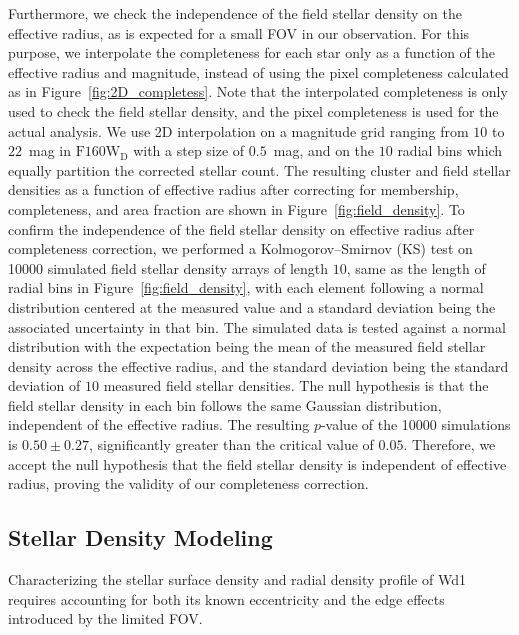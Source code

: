 \documentclass[12pt]{ucsddissertation}
\begin{document}
\begin{CJK*}{UTF8}{gbsn}
Furthermore, we check the independence of the field stellar density on the effective radius, as is expected for a small FOV in our observation. For this purpose, we interpolate the completeness for each star only as a function of the effective radius and magnitude, instead of using the pixel completeness calculated as in Figure~\ref{fig:2D_completess}. Note that the interpolated completeness is only used to check the field stellar density, and the pixel completeness is used for the actual analysis. We use 2D interpolation on a magnitude grid ranging from $10$ to $22$~mag in $\mathrm{F160W_D}$ with a step size of $0.5$~mag, and on the $10$ radial bins which equally partition the corrected stellar count. The resulting cluster and field stellar densities as a function of effective radius after correcting for membership, completeness, and area fraction are shown in Figure~\ref{fig:field_density}. To confirm the independence of the field stellar density on effective radius after completeness correction, we performed a Kolmogorov--Smirnov (KS) test on \num{10000} simulated field stellar density arrays of length $10$, same as the length of radial bins in Figure~\ref{fig:field_density}, with each element following a normal distribution centered at the measured value and a standard deviation being the associated uncertainty in that bin. The simulated data is tested against a normal distribution with the expectation being the mean of the measured field stellar density across the effective radius, and the standard deviation being the standard deviation of $10$ measured field stellar densities. The null hypothesis is that the field stellar density in each bin follows the same Gaussian distribution, independent of the effective radius. The resulting $p$-value of the \num{10000} simulations is $0.50 \pm 0.27$, significantly greater than the critical value of $0.05$. Therefore, we accept the null hypothesis that the field stellar density is independent of effective radius, proving the validity of our completeness correction.



\subsection{Stellar Density Modeling}
\label{wd1-subsec:density_modeling}

Characterizing the stellar surface density and radial density profile of Wd1 requires accounting for both its known eccentricity \citep[e.g.,][]{Muno-2006, Brandner-2008, Gennaro-2011} and the edge effects introduced by the limited FOV. 


\end{CJK*}
\end{document}
